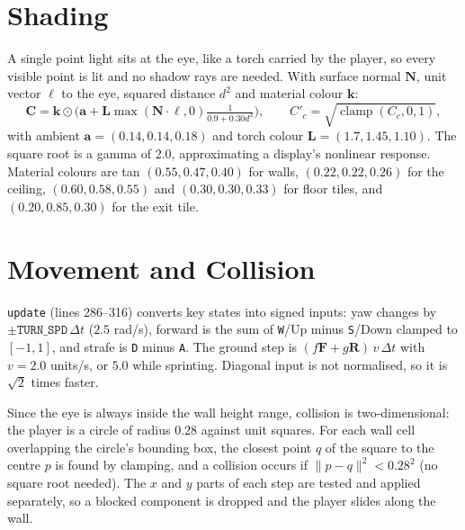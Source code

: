 
\section{Shading}

A single point light sits at the eye, like a torch carried by the player, so every visible point is lit and no shadow rays are needed. With surface normal $\mathbf{N}$, unit vector $\boldsymbol\ell$ to the eye, squared distance $d^2$ and material colour $\mathbf{k}$:
\begin{equation}
\mathbf{C}=\mathbf{k}\odot\Big(\mathbf{a}+\mathbf{L}\max(\mathbf{N}\!\cdot\!\boldsymbol\ell,0)\tfrac{1}{0.9+0.30d^2}\Big),\qquad C'_c=\sqrt{\operatorname{clamp}(C_c,0,1)},
\end{equation}
with ambient $\mathbf{a}=(0.14,0.14,0.18)$ and torch colour $\mathbf{L}=(1.7,1.45,1.10)$. The square root is a gamma of 2.0, approximating a display's nonlinear response. Material colours are tan $(0.55,0.47,0.40)$ for walls, $(0.22,0.22,0.26)$ for the ceiling, $(0.60,0.58,0.55)$ and $(0.30,0.30,0.33)$ for floor tiles, and $(0.20,0.85,0.30)$ for the exit tile.


\section{Movement and Collision}

\texttt{update} (lines 286--316) converts key states into signed inputs: yaw changes by $\pm\texttt{TURN\_SPD}\,\Delta t$ ($2.5$ rad/s), forward is the sum of \texttt{W}/Up minus \texttt{S}/Down clamped to $[-1,1]$, and strafe is \texttt{D} minus \texttt{A}. The ground step is $(f\mathbf{F}+g\mathbf{R})\,v\,\Delta t$ with $v=2.0$ units/s, or $5.0$ while sprinting. Diagonal input is not normalised, so it is $\sqrt2$ times faster.

Since the eye is always inside the wall height range, collision is two-dimensional: the player is a circle of radius $0.28$ against unit squares. For each wall cell overlapping the circle's bounding box, the closest point $q$ of the square to the centre $p$ is found by clamping, and a collision occurs if $\lVert p-q\rVert^2<0.28^2$ (no square root needed). The $x$ and $y$ parts of each step are tested and applied separately, so a blocked component is dropped and the player slides along the wall.


